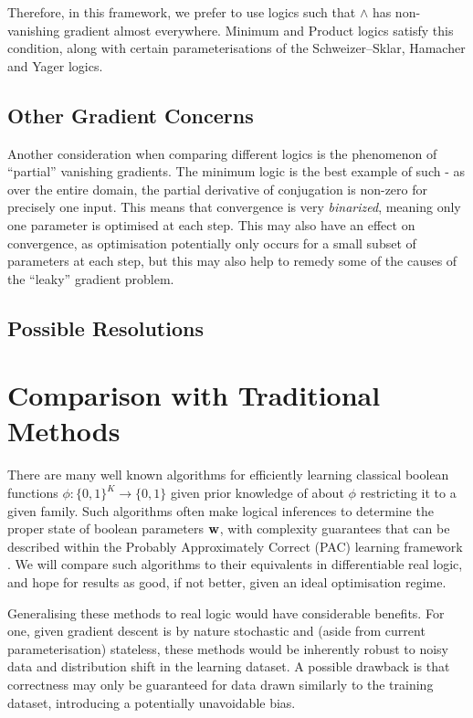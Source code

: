 Therefore, in this framework, we prefer to use logics such that $\land$ has non-vanishing gradient almost everywhere. Minimum and Product logics satisfy this condition, along with certain parameterisations of the Schweizer–Sklar, Hamacher and Yager logics.

\subsection{Other Gradient Concerns}

Another consideration when comparing different logics is the phenomenon of ``partial'' vanishing gradients. The minimum logic is the best example of such - as over the entire domain, the partial derivative of conjugation is non-zero for precisely one input. This means that convergence is very \textit{binarized}, meaning only one parameter is optimised at each step. This may also have an effect on convergence, as optimisation potentially only occurs for a small subset of parameters at each step, but this may also help to remedy some of the causes of the ``leaky'' gradient problem.

\subsection{Possible Resolutions}


\section{Comparison with Traditional Methods}

There are many well known algorithms for efficiently learning classical boolean functions $\phi : \{0,1\}^K \to \{0,1\}$ given prior knowledge of about $\phi$ restricting it to a given family. Such algorithms often make logical inferences to determine the proper state of boolean parameters $\mathbf{w}$, with complexity guarantees that can be described within the Probably Approximately Correct (PAC) learning framework \cite{clt}. We will compare such algorithms to their equivalents in differentiable real logic, and hope for results as good, if not better, given an ideal optimisation regime. 

Generalising these methods to real logic would have considerable benefits. For one, given gradient descent is by nature stochastic and (aside from current parameterisation) stateless, these methods would be inherently robust to noisy data and distribution shift in the learning dataset. A possible drawback is that correctness may only be guaranteed for data drawn similarly to the training dataset, introducing a potentially unavoidable bias.

